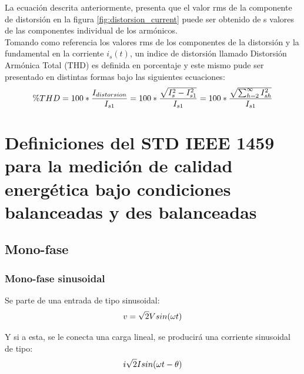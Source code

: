 La ecuación descrita anteriormente, presenta que el valor rms de la componente de distorsión en la figura \ref{fig:distorsion_current} puede ser obtenido de s valores de las componentes individual de los armónicos.\cite{A29}\\

Tomando como referencia los valores rms de los componentes de la distorsión y la fundamental en la corriente $i_{s}(t)$, un indice de distorsión llamado Distorsión Armónica Total (THD) es definida en porcentaje y este mismo pude ser presentado en distintas formas bajo las siguientes ecuaciones:\\

\begin{equation}\label{EQ13}
\%THD = 100*\frac{I_{distorsion}}{I_{s1}}\\
=100*\frac{\sqrt{I^2_{s}-I^2_{s1}}}{I_{s1}}\\
=100*\frac{\sqrt{\sum_{h=2}^{\infty}I^2_{sh}}}{I_{s1}}\\
\end{equation}



\section{ Definiciones del STD IEEE 1459 para la medición de calidad energética bajo condiciones balanceadas y des balanceadas }
\subsection{Mono-fase}
\subsubsection{Mono-fase sinusoidal}

Se parte de una entrada de tipo sinusoidal:\\
\begin{equation}\label{EQ14}
v=\sqrt{2}V sin(\omega t)\\
\end{equation}

Y si a esta, se le conecta una carga lineal, se producirá una corriente sinusoidal de tipo:\\

\begin{equation}\label{EQ15}
i\sqrt{2}I sin(\omega t - \theta)\\
\end{equation}

